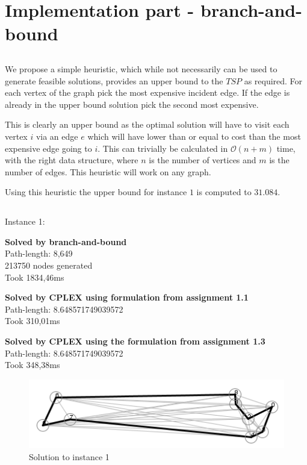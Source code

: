\section{Implementation part - branch-and-bound}
\subsection{}
We propose a simple heuristic, which while not necessarily can be used to generate feasible solutions, provides an upper bound to the $TSP$ as required. For each vertex of the graph pick the most expensive incident edge. If the edge is already in the upper bound solution pick the second most expensive. 

This is clearly an upper bound as the optimal solution will have to visit each vertex $i$ via an edge $e$ which will have lower than or equal to cost than the most expensive edge going to $i$. This can trivially be calculated in $\mathcal{O}(n+m)$ time, with the right data structure, where $n$ is the number of vertices and $m$ is the number of edges. This heuristic will work on any graph.

Using this heuristic the upper bound for instance $1$ is computed to $31.084$.

\subsection{}
Instance 1:

\newpar \textbf{Solved by branch-and-bound}\\
Path-length: 8,649\\
213750 nodes generated\\
Took 1834,46ms

\newpar \textbf{Solved by CPLEX using formulation from assignment 1.1}\\
Path-length: 8.648571749039572\\
Took 310,01ms

\newpar \textbf{Solved by CPLEX using the formulation from assignment 1.3}\\
Path-length: 8.648571749039572\\
Took 348,38ms

\begin{figure}[H]
	\includegraphics[width=.9\textwidth]{figures/Instance1Solution.png}
	\caption{Solution to instance 1}
	\label{solution:1}
\end{figure}

